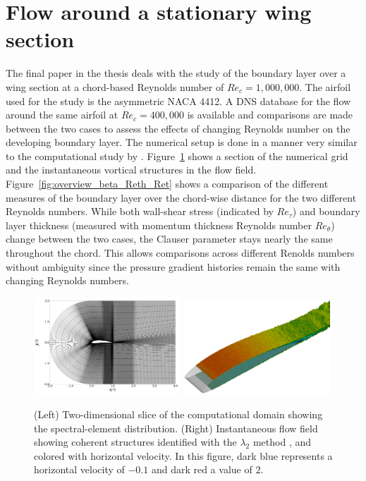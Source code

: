 \section{Flow around a stationary wing section}

The final paper in the thesis deals with the study of the boundary layer over a wing section at a chord-based Reynolds number of $Re_{c}=1,000,000$. The airfoil used for the study is the asymmetric NACA 4412. A DNS database for the flow around the same airfoil at $Re_{c}=400,000$ is available and comparisons are made between the two cases to assess the effects of changing Reynolds number on the developing boundary layer. The numerical setup is done in a manner very similar to the computational study by \cite{hosseini16}. Figure~\ref{fig:overview_flow_field_re1000k} shows a section of the numerical grid and the instantaneous vortical structures in the flow field. Figure~\ref{fig:overview_beta_Reth_Ret} shows a comparison of the different measures of the boundary layer over the chord-wise distance for the two different Reynolds numbers. While both wall-shear stress (indicated by $Re_{\tau}$) and boundary layer thickness (measured with momentum thickness Reynolds number $Re_{\theta}$) change between the two cases, the Clauser parameter stays nearly the same throughout the chord. This allows comparisons across different Renolds numbers without ambiguity since the pressure gradient histories remain the same with changing Reynolds numbers. 
\begin{figure}[t]
	\centering
	\includegraphics[width=0.49\textwidth]{paper4/imgs/wing_mesh}
	\includegraphics[width=0.49\textwidth]{paper4/imgs/wing_visualization}
	\caption{(Left) Two-dimensional slice of the computational domain showing the spectral-element distribution. (Right) Instantaneous flow field showing coherent structures identified with the $\lambda_{2}$ method \citep{jeong95}, and colored with horizontal velocity. In this figure, dark blue represents a horizontal velocity of $-0.1$ and dark red a value of $2$.}
	\label{fig:overview_flow_field_re1000k}
\end{figure}

